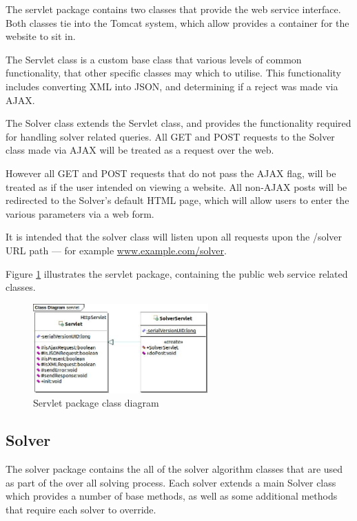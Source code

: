 The servlet package contains two classes that provide the web service interface.
Both classes tie into the Tomcat system, which allow provides a container for 
the website to sit in. 

The Servlet class is a custom base class that various levels of common 
functionality, that other specific classes may which to utilise. This 
functionality includes converting XML into JSON, and determining if a reject was
made via AJAX.

The Solver class extends the Servlet class, and provides the functionality 
required for handling solver related queries. All GET and POST requests to the
Solver class made via AJAX will be treated as a request over the web. 

However all GET and POST requests that do not pass the AJAX flag, will be 
treated as if the user intended on viewing a website. All non-AJAX posts will be 
redirected to the Solver's default HTML page, which will allow users to enter 
the various parameters via a web form.

It is intended that the solver class will listen upon all requests upon the 
/solver URL path --- for example \href{}{www.example.com/solver}.

Figure \ref{fig:servlet_package} illustrates the servlet package, containing 
the public web service related classes.

\begin{figure}[H]
  \centering
  \includegraphics[width=0.6\textwidth]{design/class/servlet.jpg}
  \caption{Servlet package class diagram}
  \label{fig:servlet_package}
\end{figure}


\subsection{Solver}
\label{sub:solver}

The solver package contains the all of the solver algorithm classes that are 
used as part of the over all solving process. Each solver extends a main Solver
class which provides a number of base methods, as well as some additional 
methods that require each solver to override.

